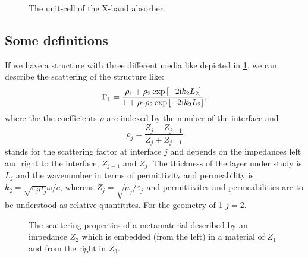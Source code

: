 \begin{figure}
\caption{The unit-cell of the X-band absorber.}
\end{figure}


\subsection{Some definitions}

If we have a structure with three different media like depicted in \cref{fig:stacked_structure}, we can describe the scattering of the structure like:
\begin{equation}
\Gamma_1 = \frac{\rho_1+\rho_2 \exp\left[-2\mathrm{i} k_2 L_2\right]}
{1+\rho_1\rho_2 \exp\left[-2\mathrm{i} k_2 L_2\right]},
\label{eqn:2layerGamma}
\end{equation}
where the the coefficients $\rho$ are indexed by the number of the interface and 
\begin{equation}
\rho_j = \frac{Z_j - Z_{j-1} }{Z_j + Z_{j-1} }
\label{eqn:rho}
\end{equation}
stands for the scattering factor at interface $j$ and depends on the impedances left and right to the interface, 
$Z_{j-1}$ and $Z_j$. The thickness of the layer under study is $L_j$ and the wavenumber in terms of permittivity 
and permeability is $k_2=\sqrt{\varepsilon_j\mu_j} \omega/c$, whereas $Z_j=\sqrt{\mu_j/\varepsilon_j}$ and permittivites and permeabilities are to be understood as relative quantitites. For the geometry of \cref{fig:stacked_structure} $j=2$.


\begin{figure}
\centering
{}
\caption{The scattering properties of a metamaterial described by an impedance $Z_2$ which is embedded (from the left) in a material of $Z_1$ and from the right in $Z_3$.}
\label{fig:stacked_structure}
\end{figure}


